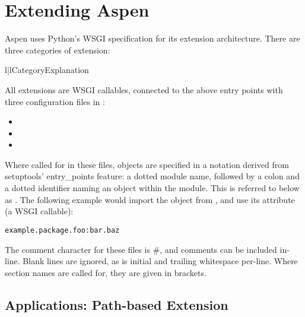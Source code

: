 \chapter{Extending Aspen}

Aspen uses Python's WSGI specification for its extension architecture. There are
three categories of extension:

\begin{tableii}{l|l}{}{Category}{Explanation}
\end{tableii}

All extensions are WSGI callables, connected to the above entry points with
three configuration files in :

\begin{itemize}
\item{}
\item{}
\item{}
\end{itemize}

Where called for in these files, objects are specified in a notation derived
from setuptools' entry_points feature: a dotted module name, followed by a colon
and a dotted identifier naming an object within the module. This is referred to
below as . The following example would import the 
object from , and use its  attribute (a WSGI
callable):

\begin{verbatim}
example.package.foo:bar.baz
\end{verbatim}

The comment character for these files is \#, and comments can be included
in-line. Blank lines are ignored, as is initial and trailing whitespace
per-line. Where section names are called for, they are given in brackets.


\section{Applications: Path-based Extension \label{apps}}

